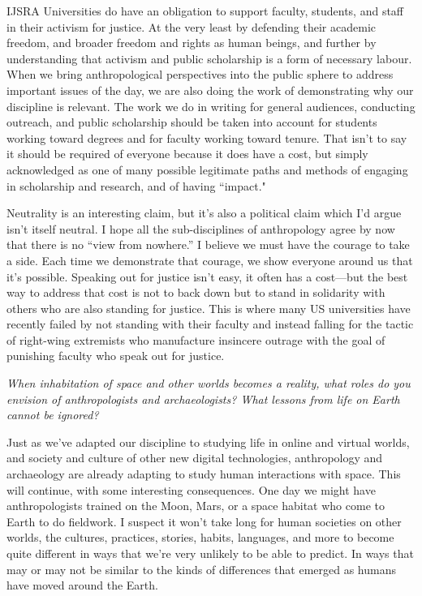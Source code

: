 \begin{labeling}{IJSRA}
	Universities do have an obligation to support faculty, students, and staff in their activism for justice. At the very least by defending their academic freedom, and broader freedom and rights as human beings, and further by understanding that activism and public scholarship is a form of necessary labour. When we bring anthropological perspectives into the public sphere to address important issues of the day, we are also doing the work of demonstrating why our discipline is relevant. The work we do in writing for general audiences, conducting outreach, and public scholarship should be taken into account for students working toward degrees and for faculty working toward tenure. That isn’t to say it should be required of everyone because it does have a cost, but simply acknowledged as one of many possible legitimate paths and methods of engaging in scholarship and research, and of having “impact."

	Neutrality is an interesting claim, but it’s also a political claim which I’d argue isn’t itself neutral. I hope all the sub-disciplines of anthropology agree by now that there is no “view from nowhere.” I believe we must have the courage to take a side. Each time we demonstrate that courage, we show everyone around us that it’s possible. Speaking out for justice isn’t easy, it often has a cost—but the best way to address that cost is not to back down but to stand in solidarity with others who are also standing for justice. This is where many US universities have recently failed by not standing with their faculty and instead falling for the tactic of right-wing extremists who manufacture insincere outrage with the goal of punishing faculty who speak out for justice.

	\item[IJSRA] \emph{When inhabitation of space and other worlds becomes a reality, what roles do you envision of anthropologists and archaeologists? What lessons from life on Earth cannot be ignored?}

	\item[MO-R] Just as we’ve adapted our discipline to studying life in online and virtual worlds, and society and culture of other new digital technologies, anthropology and archaeology are already adapting to study human interactions with space. This will continue, with some interesting consequences. One day we might have anthropologists trained on the Moon, Mars, or a space habitat who come to Earth to do fieldwork. I suspect it won’t take long for human societies on other worlds, the cultures, practices, stories, habits, languages, and more to become quite different in ways that we’re very unlikely to be able to predict. In ways that may or may not be similar to the kinds of differences that emerged as humans have moved around the Earth.


\end{labeling}
